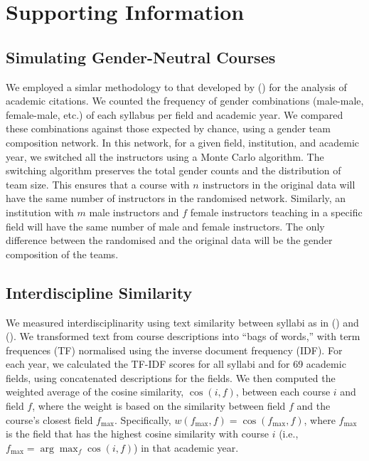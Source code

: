\documentclass[
  12pt,
]{article}
\let\oldsection\section
\renewcommand{\section}{\clearpage\oldsection}
\begin{document}
\newpage 
\appendix
\renewcommand{\thefigure}{SI-\arabic{figure}}
\renewcommand{\thesection}{SI}
\renewcommand{\thesubsection}{SI-\arabic{subsection}}
\setcounter{figure}{0}
\setcounter{section}{0}
\setcounter{subsection}{0}
\renewcommand{\thetable}{SI-\arabic{table}}

\section{Supporting Information}\label{supporting-information}

\subsection{Simulating Gender-Neutral Courses}\label{si-simulations}

We employed a simlar methodology to that developed by () for the analysis of academic citations. We counted the frequency of gender combinations (male-male, female-male, etc.) of each syllabus per field and academic year. We compared these combinations against those expected by chance, using a gender team composition network. In this network, for a given field, institution, and academic year, we switched all the instructors using a Monte Carlo algorithm. The switching algorithm preserves the total gender counts and the distribution of team size. This ensures that a course with \(n\) instructors in the original data will have the same number of instructors in the randomised network. Similarly, an institution with \(m\) male instructors and \(f\) female instructors teaching in a specific field will have the same number of male and female instructors. The only difference between the randomised and the original data will be the gender composition of the teams.

\subsection{Interdiscipline Similarity}\label{si-interdisciplinarity}

We measured interdisciplinarity using text similarity between syllabi as in () and (). We transformed text from course descriptions into ``bags of words,'' with term frequences (TF) normalised using the inverse document frequency (IDF). For each year, we calculated the TF-IDF scores for all syllabi and for 69 academic fields, using concatenated descriptions for the fields. We then computed the weighted average of the cosine similarity, \(\cos (i, f)\), between each course \(i\) and field \(f\), where the weight is based on the similarity between field \(f\) and the course's closest field \(f_{\max}\). Specifically, \(w(f_{\max}, f) = \cos(f_{\max}, f)\), where \(f_{\max}\) is the field that has the highest cosine similarity with course \(i\) (i.e., \(f_{\max} = \arg\max_f \cos(i, f)\)) in that academic year.
\end{document}
